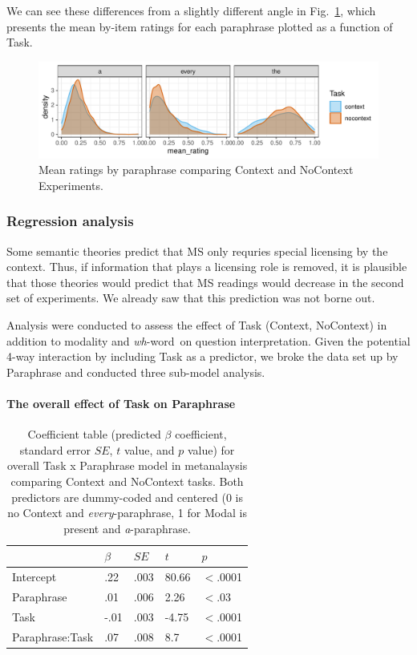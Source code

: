 \documentclass[12pt,letterpaper,table,svgnames,dvipsnames]{article}
\newcommand{\figref}[1]{Fig.~\ref{#1}}
\newcommand{\whw}{\emph{wh}-word~}
\begin{document}
We can see these differences from a slightly different angle in \figref{density_Task_overall}, which presents the mean by-item ratings for each paraphrase plotted as a function of Task. 
\begin{figure}[h!]
\centering
\centering
\includegraphics[scale=1]{figures/denisty_context_ratings.pdf}
\caption{Mean ratings by paraphrase comparing Context and NoContext Experiments.}
\label{density_Task_overall}
\end{figure}


\subsubsection{Regression analysis}
Some semantic theories predict that MS only requries special licensing by the context. Thus, if information that plays a licensing role is removed, it is plausible that those theories would predict that MS readings would decrease in the second set of experiments. We already saw that this prediction was not borne out. 

Analysis were conducted to assess the effect of Task (Context, NoContext) in addition to modality and \whw on question interpretation. Given the potential 4-way interaction by including Task as a predictor, we broke the data set up by Paraphrase and conducted three sub-model analysis.


\paragraph{The overall effect of Task on Paraphrase}

\begin{table}
\begin{center} 
\caption{Coefficient table (predicted $\beta$ coefficient, standard error $SE$, $t$ value, and $p$ value) for overall Task x Paraphrase model in metanalaysis comparing Context and NoContext tasks. Both predictors are dummy-coded and centered (0 is no Context and \emph{every}-paraphrase, 1 for Modal is present and \emph{a}-paraphrase.} 
\label{sub-model_res_Task} 
\begin{tabular}{lllll} 
\toprule
{} & $\beta$ & $SE$ & $t$ & $p$\\
\midrule
Intercept & .22 & .003 & 80.66 & $<$.0001\\
Paraphrase & .01 & .006 & 2.26 & $<$.03\\
Task & -.01 & .003 & -4.75 & $<$.0001\\
Paraphrase:Task & .07 & .008 & 8.7 & $<$.0001\\
\bottomrule
\end{tabular} 
\end{center} 
\end{table}
\end{document}

